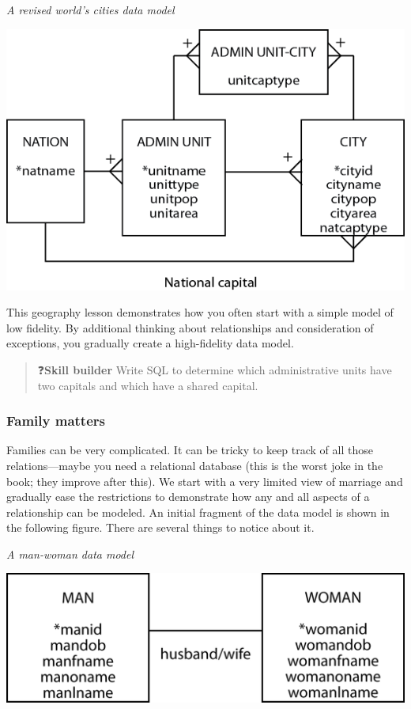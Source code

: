 \documentclass[
]{article}
\begin{document}
\emph{A revised world's cities data model}

\includegraphics{Figures/Chapter 7/geography revised.png}

This geography lesson demonstrates how you often start with a simple
model of low fidelity. By additional thinking about relationships and
consideration of exceptions, you gradually create a high-fidelity data
model.

\begin{quote}
❓\textbf{Skill builder} Write SQL to determine which administrative units
have two capitals and which have a shared capital.
\end{quote}

\hypertarget{family-matters}{%
\subsubsection*{Family matters}\label{family-matters}}

Families can be very complicated. It can be tricky to keep track of all
those relations---maybe you need a relational database (this is the
worst joke in the book; they improve after this). We start with a very
limited view of marriage and gradually ease the restrictions to
demonstrate how any and all aspects of a relationship can be modeled. An
initial fragment of the data model is shown in the following figure.
There are several things to notice about it.

\emph{A man-woman data model}

\includegraphics[width=5.48958in,height=\textheight]{Figures/Chapter 7/marriage-1.png}
\end{document}
